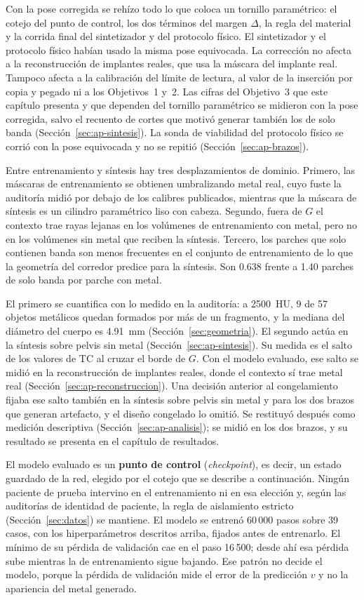 Con la pose corregida se rehízo todo lo que coloca un tornillo paramétrico: el cotejo del punto de control, los dos términos del margen $\Delta$, la regla del material y la corrida final del sintetizador y del protocolo físico. El sintetizador y el protocolo físico habían usado la misma pose equivocada. La corrección no afecta a la reconstrucción de implantes reales, que usa la máscara del implante real. Tampoco afecta a la calibración del límite de lectura, al valor de la inserción por copia y pegado ni a los Objetivos~1 y~2. Las cifras del Objetivo~3 que este capítulo presenta y que dependen del tornillo paramétrico se midieron con la pose corregida, salvo el recuento de cortes que motivó generar también los de solo banda (Sección~\ref{sec:ap-sintesis}). La sonda de viabilidad del protocolo físico se corrió con la pose equivocada y no se repitió (Sección~\ref{sec:ap-brazos}).

Entre entrenamiento y síntesis hay tres desplazamientos de dominio. Primero, las máscaras de entrenamiento se obtienen umbralizando metal real, cuyo fuste la auditoría midió por debajo de los calibres publicados, mientras que la máscara de síntesis es un cilindro paramétrico liso con cabeza. Segundo, fuera de $G$ el contexto trae rayas lejanas en los volúmenes de entrenamiento con metal, pero no en los volúmenes sin metal que reciben la síntesis. Tercero, los parches que solo contienen banda son menos frecuentes en el conjunto de entrenamiento de lo que la geometría del corredor predice para la síntesis. Son 0.638 frente a 1.40 parches de solo banda por parche con metal.

El primero se cuantifica con lo medido en la auditoría: a 2500~HU, 9 de 57 objetos metálicos quedan formados por más de un fragmento, y la mediana del diámetro del cuerpo es 4.91~mm (Sección~\ref{sec:geometria}). El segundo actúa en la síntesis sobre pelvis sin metal (Sección~\ref{sec:ap-sintesis}). Su medida es el salto de los valores de TC al cruzar el borde de $G$. Con el modelo evaluado, ese salto se midió en la reconstrucción de implantes reales, donde el contexto sí trae metal real (Sección~\ref{sec:ap-reconstruccion}). Una decisión anterior al congelamiento fijaba ese salto también en la síntesis sobre pelvis sin metal y para los dos brazos que generan artefacto, y el diseño congelado lo omitió. Se restituyó después como medición descriptiva (Sección~\ref{sec:ap-analisis}); se midió en los dos brazos, y su resultado se presenta en el capítulo de resultados.

El modelo evaluado es un \textbf{punto de control} (\emph{checkpoint}), es decir, un estado guardado de la red, elegido por el cotejo que se describe a continuación. Ningún paciente de prueba intervino en el entrenamiento ni en esa elección y, según las auditorías de identidad de paciente, la regla de aislamiento estricto (Sección~\ref{sec:datos}) se mantiene. El modelo se entrenó 60\,000 pasos sobre 39 casos, con los hiperparámetros descritos arriba, fijados antes de entrenarlo. El mínimo de su pérdida de validación cae en el paso 16\,500; desde ahí esa pérdida sube mientras la de entrenamiento sigue bajando. Ese patrón no decide el modelo, porque la pérdida de validación mide el error de la predicción $v$ y no la apariencia del metal generado.

